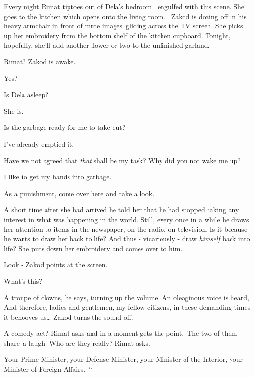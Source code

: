 \documentclass[letterpaper]{article}
\begin{document}
Every night Rimat tiptoes out of Dela's bedroom \ engulfed with this scene. She goes to the kitchen which opens onto the
living room. \ Zakod is dozing off in his heavy armchair in front of mute images~gliding across the TV screen. She
picks up her embroidery from the bottom shelf of the kitchen cupboard. Tonight, hopefully, she'll add another flower or
two to the unfinished garland.

{\textquotedbl}Rimat?{\textquotedbl} Zakod is awake. 

{\textquotedbl}Yes?{\textquotedbl}

{\textquotedbl}Is Dela asleep?{\textquotedbl} 

{\textquotedbl}She is.{\textquotedbl} 

{\textquotedbl}Is the garbage ready for me to take out?{\textquotedbl} 

{\textquotedbl}I've already emptied it.{\textquotedbl} 

{\textquotedbl}Have we not agreed that \textit{that} shall be my task? Why did you not wake me up?{\textquotedbl} 

{\textquotedbl}I like to get my hands into garbage.{\textquotedbl} 

{\textquotedbl}As a punishment, come over here and take a look.{\textquotedbl}

A short time after she had arrived he told her that he had stopped taking any interest in what was happening in the
world. Still, every once in a while he draws her attention to items in the newspaper, on the radio, on television. Is
it because he wants to draw her back to life? And thus - vicariously - draw \textit{himself} back into life? She puts
down her embroidery and comes over to him. 

{\textquotedbl}Look -{\textquotedbl} Zakod points at the screen. 

{\textquotedbl}What's this?{\textquotedbl} 

{\textquotedbl}A troupe of clowns,{\textquotedbl} he says, turning up the volume. An oleaginous voice is heard,
{\textquotedbl}And therefore, ladies and gentlemen, my fellow citizens, in these demanding times it behooves
us{\dots}{\textquotedbl} Zakod turns the sound off. 

{\textquotedbl}A comedy act?{\textquotedbl} Rimat asks and in a moment gets the point.~The two of them share~a laugh.
{\textquotedbl}Who are they really?{\textquotedbl} Rimat asks. 

{\textquotedbl}Your Prime Minister, your Defense Minister, your Minister of the Interior, your Minister of Foreign
Affairs.--``
\end{document}
